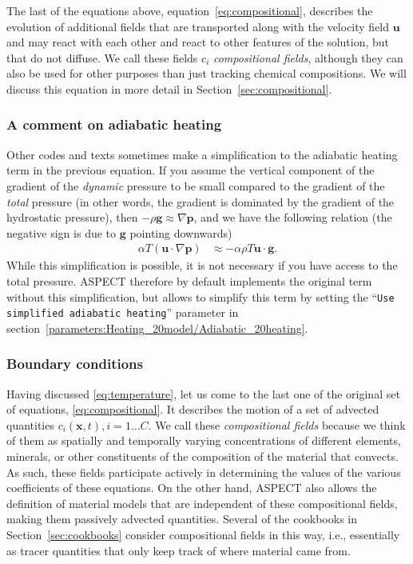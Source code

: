 \documentclass{article}
\newcommand{\aspect}{\textsc{ASPECT}}
\begin{document}
The last of the equations above, equation~\eqref{eq:compositional}, describes
the evolution of additional fields that are transported along with the
velocity field $\mathbf u$ and may react with each other and react to other
features of the solution, but that do not diffuse. We call these fields $c_i$
\textit{compositional fields}, although they can also be used for other
purposes than just tracking chemical compositions. We will discuss this
equation in more detail in Section~\ref{sec:compositional}.

\subsubsection{A comment on adiabatic heating}
Other codes and texts sometimes make a simplification to the adiabatic heating
term in the previous equation. If you assume the vertical component of the
gradient of the \textit{dynamic} pressure to be small compared to the gradient
of the \textit{total} pressure (in other words, the gradient is dominated by
the gradient of the hydrostatic pressure), then $ -\rho \mathbf g \approx
\nabla \mathbf{p} $, and we have the following relation (the negative sign is
due to $\mathbf g$ pointing downwards) 
\begin{align*}
\alpha T \left( \mathbf u \cdot \nabla \mathbf p \right)
  & \approx -\alpha \rho T \mathbf u \cdot \mathbf g.
\end{align*}
While this simplification is possible, it is not necessary if you have access
to the total pressure. \aspect{} therefore by default implements the original 
term without this simplification, but allows to simplify this term by setting
the ``\texttt{Use simplified adiabatic heating}'' 
parameter in section~\ref{parameters:Heating_20model/Adiabatic_20heating}.

\subsubsection{Boundary conditions}
Having discussed \eqref{eq:temperature}, let us come to the last one of the
original set of equations, \eqref{eq:compositional}. It describes the
motion of a set of advected quantities $c_i(\mathbf x,t),i=1\ldots C$. We call these
\textit{compositional fields} because we think of them as spatially and
temporally varying concentrations of different elements, minerals, or other
constituents of the composition of the material that convects. As such, these
fields participate actively in determining the values of the various
coefficients of these equations. On the other hand, \aspect{} also allows the
definition of material models that are independent of these compositional
fields, making them passively advected quantities. Several of the cookbooks in
Section~\ref{sec:cookbooks} consider compositional fields in this way, i.e.,
essentially as tracer quantities that only keep track of where material came
from.
\end{document}
